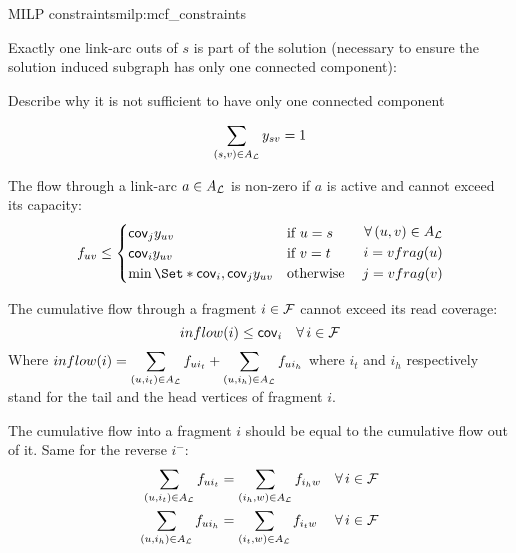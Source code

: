 \begin{definition}{\MCF{} MILP constraints}{milp:mcf_constraints}

  Exactly one link-arc outs of \(s\) is part of the solution (necessary to ensure the solution induced subgraph has only one connected component):
  \begin{todobox}
    Describe why it is not sufficient to have only one connected component
  \end{todobox}
  \begin{equation}
    \sum_{(s, v) \in A_{\mathcal{L}}{}} y_{sv} = 1
  \end{equation}

  The flow through a link-arc \(a \in A_{\mathcal{L}}{}\) is non-zero if \(a\) is active and cannot exceed its capacity:
  \begin{equation}
    \begin{split}
      f_{uv} \leq
      \begin{cases}
        \cov{j} y_{uv} & \text{if \(u = s\)} \\
        \cov{i} y_{uv} & \text{if \(v = t\)} \\
        \min\Set*{\cov{i}, \cov{j}} y_{uv} & \text{otherwise}
      \end{cases} \quad
      \begin{split}
        \forall (u, v) \in A_\Links{} \\
        i = vfrag(u) \\
        j = vfrag(v)
      \end{split}
    \end{split}
  \end{equation}

  The cumulative flow through a fragment \(i \in \mathcal{F}{}\) cannot exceed its read coverage:
  \begin{equation}
    inflow(i) \leq \cov{i} \quad \forall i \in \Fragments{}
  \end{equation}
  Where \(\displaystyle inflow(i) = \sum_{(u, i_t) \in A_{\mathcal{L}}{}} f_{ui_t} + \sum_{(u, i_h) \in A_{\mathcal{L}}{}} f_{ui_h}\) where \(i_t\) and \(i_h\) respectively stand for the tail and the head vertices of fragment \(i\).

  The cumulative flow into a fragment \(i\) should be equal to the cumulative flow out of it. Same for the reverse \(i^-\):
  \begin{align}
    \sum_{(u, i_t) \in A_\Links{}} f_{u i_t} & = \sum_{(i_h, w) \in A_\Links{}} f_{i_h w} & \forall i \in \Fragments{} \\
    \sum_{(u, i_h) \in A_\Links{}} f_{u i_h} & = \sum_{(i_t, w) \in A_\Links{}} f_{i_t w} & \forall i \in \Fragments{}
  \end{align}


\end{definition}
